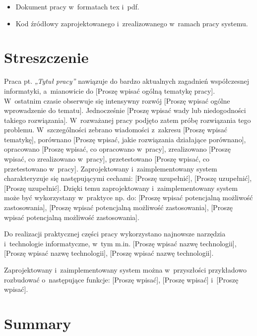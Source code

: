 \documentclass{PracaDyplomowa}
\begin{document}
\begin{itemize}
\item Dokument pracy w~formatach tex i~pdf.

\item Kod źródłowy zaprojektowanego i~zrealizowanego w~ramach pracy systemu.
\end{itemize}

\listoffigures
{}

\listoftables
{}

\lstlistoflistings
{}

\chapter*{Streszczenie}

Praca pt. \textit{„Tytuł pracy”} nawiązuje do bardzo aktualnych zagadnień współczesnej informatyki, a~mianowicie do [Proszę wpisać ogólną tematykę pracy]. W~ostatnim czasie obserwuje się intensywny rozwój [Proszę wpisać ogólne wprowadzenie do tematu]. Jednocześnie [Proszę wpisać wady lub niedogodności takiego rozwiązania]. W~rozważanej pracy podjęto zatem próbę rozwiązania tego problemu. W~szczególności zebrano wiadomości z~zakresu [Proszę wpisać tematykę], porównano [Proszę wpisać, jakie rozwiązania działające porównano], opracowano [Proszę wpisać, co opracowano w~pracy], zrealizowano [Proszę wpisać, co zrealizowano w~pracy], przetestowano [Proszę wpisać, co przetestowano w~pracy]. Zaprojektowany i~zaimplementowany system charakteryzuje się następującymi cechami: [Proszę uzupełnić], [Proszę uzupełnić], [Proszę uzupełnić]. Dzięki temu zaprojektowany i~zaimplementowany system może być wykorzystany w~praktyce np. do: [Proszę wpisać potencjalną możliwość zastosowania], [Proszę wpisać potencjalną możliwość zastosowania], [Proszę wpisać potencjalną możliwość zastosowania].

Do realizacji praktycznej części pracy wykorzystano najnowsze narzędzia i~technologie informatyczne, w~tym m.in. [Proszę wpisać nazwę technologii], [Proszę wpisać nazwę technologii], [Proszę wpisać nazwę technologii].

Zaprojektowany i~zaimplementowany system można w~przyszłości przykładowo rozbudować o~następujące funkcje: [Proszę wpisać], [Proszę wpisać] i~[Proszę wpisać].

\chapter*{Summary}
\end{document}

